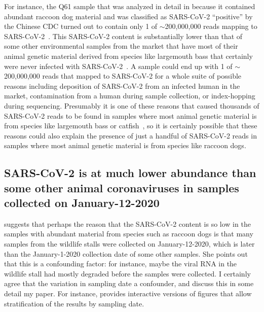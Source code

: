 \documentclass[9pt,twocolumn,twoside]{gsajnl_modified}
\begin{document}
For instance, the Q61 sample that was analyzed in detail in \citet{crits2023genetic} because it contained abundant raccoon dog material and was classified as SARS-CoV-2 ``positive'' by the Chinese CDC turned out to contain only 1 of $\sim$200,000,000 reads mapping to SARS-CoV-2~\citep{bloom2023association}.
This SARS-CoV-2 content is substantially lower than that of some other environmental samples from the market that have most of their animal genetic material derived from species like largemouth bass that certainly were never infected with SARS-CoV-2~\citep{bloom2023association}.
A sample could end up with 1 of $\sim$200,000,000 reads that mapped to SARS-CoV-2 for a whole suite of possible reasons including deposition of SARS-CoV-2 from an infected human in the market, contamination from a human during sample collection, or index-hopping during sequencing.
Presumably it is one of these reasons that caused thousands of SARS-CoV-2 reads to be found in samples where most animal genetic material is from species like largemouth bass or catfish~\citep{bloom2023association}, so it is certainly possible that these reasons could also explain the presence of just a handful of SARS-CoV-2 reads in samples where most animal genetic material is from species like raccoon dogs.

\subsection{SARS-CoV-2 is at much lower abundance than some other animal coronaviruses in samples collected on January-12-2020}
\citet{debarre2024what} suggests that perhaps the reason that the SARS-CoV-2 content is so low in the samples with abundant material from species such as raccoon dogs is that many samples from the wildlife stalls were collected on January-12-2020, which is later than the January-1-2020 collection date of some other samples.
She points out that this is a confounding factor: for instance, maybe the viral RNA in the wildlife stall had mostly degraded before the samples were collected.
I certainly agree that the variation in sampling date a confounder, and discuss this in some detail my paper.
For instance, \citet{bloom2023association} provides interactive versions of figures that allow stratification of the results by sampling date.
\end{document}
